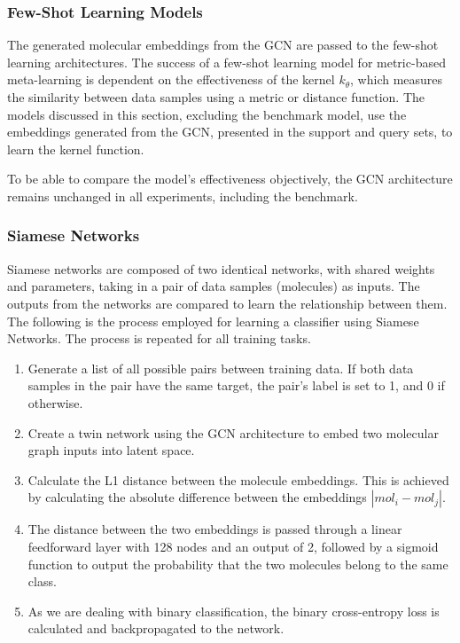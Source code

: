 \subsubsection{Few-Shot Learning Models}

The generated molecular embeddings from the GCN are passed to the few-shot learning architectures. The success of a few-shot learning model for metric-based meta-learning is dependent on the effectiveness of the kernel $k_\theta$, which measures the similarity between data samples using a metric or distance function. The models discussed in this section, excluding the benchmark model, use the embeddings generated from the GCN, presented in the support and query sets, to learn the kernel function.

To be able to compare the model's effectiveness objectively, the GCN architecture remains unchanged in all experiments, including the benchmark.

\subsubsection{Siamese Networks}

Siamese networks \citep{koch2015siamese} are composed of two identical networks, with shared weights and parameters, taking in a pair of data samples (molecules) as inputs. The outputs from the networks are compared to learn the relationship between them. The following is the process employed for learning a classifier using Siamese Networks. The process is repeated for all training tasks.

\begin{enumerate}
    \item Generate a list of all possible pairs between training data. If both data samples in the pair have the same target, the pair's label is set to 1, and 0 if otherwise.
    \item Create a twin network using the GCN architecture to embed two molecular graph inputs into latent space.
    \item Calculate the L1 distance between the molecule embeddings. This is achieved by calculating the absolute difference between the embeddings $|mol_i-mol_j|$.
    \item The distance between the two embeddings is passed through a linear feedforward layer with 128 nodes and an output of 2, followed by a sigmoid function to output the probability that the two molecules belong to the same class.
    \item As we are dealing with binary classification, the binary cross-entropy loss is calculated and backpropagated to the network.
\end{enumerate}

